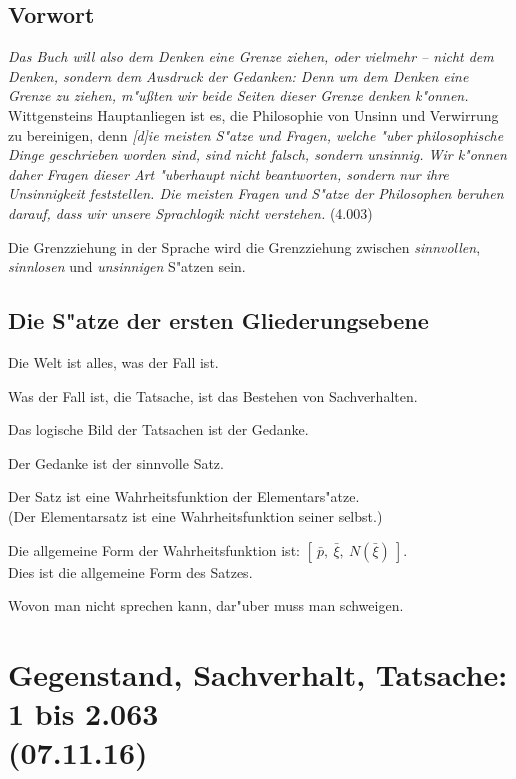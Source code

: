 \documentclass[]{scrartcl}
\begin{document}
\subsection{Vorwort}

\emph{Das Buch will also dem Denken eine Grenze ziehen, oder vielmehr --	
 nicht dem Denken, sondern dem Ausdruck der Gedanken: Denn um dem Denken eine Grenze zu ziehen, m"ußten wir beide Seiten dieser Grenze denken k"onnen.} Wittgensteins Hauptanliegen ist es, die Philosophie von Unsinn und Verwirrung zu bereinigen, denn \emph{[d]ie meisten S"atze und Fragen, welche "uber philosophische Dinge geschrieben worden sind, sind nicht falsch, sondern unsinnig. Wir k"onnen daher Fragen dieser Art "uberhaupt nicht beantworten, sondern nur ihre Unsinnigkeit feststellen. Die meisten Fragen und S"atze der Philosophen beruhen darauf, dass wir unsere Sprachlogik nicht verstehen.} (4.003)

Die Grenzziehung in der Sprache wird die Grenzziehung zwischen \emph{sinnvollen}, \emph{sinnlosen} und \emph{unsinnigen} S"atzen sein.

\subsection{Die S"atze der ersten Gliederungsebene}
\begin{description}[leftmargin=!,labelwidth=\widthof{\bfseries 12}]
  \item[1] Die Welt ist alles, was der Fall ist.
  \item[2] Was der Fall ist, die Tatsache, ist das Bestehen von Sachverhalten.
  \item[3] Das logische Bild der Tatsachen ist der Gedanke.
  \item[4] Der Gedanke ist der sinnvolle Satz.
  \item[5] Der Satz ist eine Wahrheitsfunktion der Elementars"atze.\\
(Der Elementarsatz ist eine Wahrheitsfunktion seiner selbst.)
  \item[6] Die allgemeine Form der Wahrheitsfunktion ist: $[~\bar{p},~\bar{\xi},~N(\bar{\xi})~]$.\\
Dies ist die allgemeine Form des Satzes.
  \item[7] Wovon man nicht sprechen kann, dar"uber muss man schweigen.
\end{description}

\section{Gegenstand, Sachverhalt, Tatsache: 1 bis 2.063\\(07.11.16)}
\end{document}
